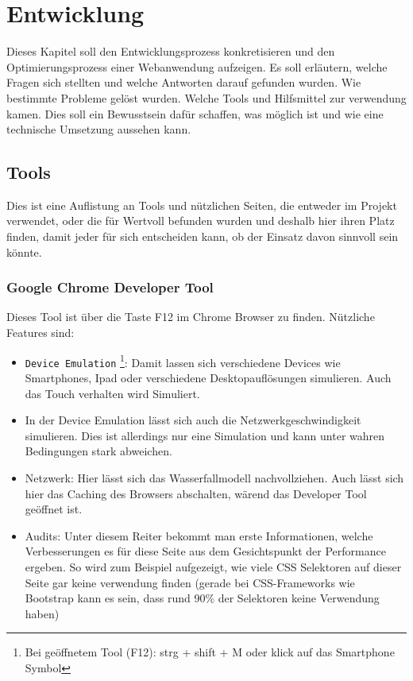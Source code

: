 \section{Entwicklung} %
\label{sec:entwicklung}
	Dieses Kapitel soll den Entwicklungsprozess konkretisieren und den Optimierungsprozess einer Webanwendung aufzeigen. Es soll erläutern, welche Fragen sich stellten und welche Antworten darauf gefunden wurden. Wie bestimmte Probleme gelöst wurden. Welche Tools und Hilfsmittel zur verwendung kamen. Dies soll ein Bewusstsein dafür schaffen, was möglich ist und wie eine technische Umsetzung aussehen kann. 
	
	\subsection{Tools}
	\label{sub:tools}
		Dies ist eine Auflistung an Tools und nützlichen Seiten, die entweder im Projekt verwendet, oder die für Wertvoll befunden wurden und deshalb hier ihren Platz finden, damit jeder für sich entscheiden kann, ob der Einsatz davon sinnvoll sein könnte.

		\subsubsection{Google Chrome Developer Tool} %
		\label{ssub:google_chrome_developertool}
			Dieses Tool ist über die Taste F12 im Chrome Browser zu finden. Nützliche Features sind: 

			\begin{itemize}
				\item \texttt{Device Emulation} \footnote{Bei geöffnetem Tool (F12): strg + shift + M oder klick auf das Smartphone Symbol}: Damit lassen sich verschiedene Devices wie Smartphones, Ipad oder verschiedene Desktopauflösungen simulieren. Auch das Touch verhalten wird Simuliert.
				\item In der Device Emulation lässt sich auch die Netzwerkgeschwindigkeit simulieren. Dies ist allerdings nur eine Simulation und kann unter wahren Bedingungen stark abweichen.
				\item Netzwerk: Hier lässt sich das Wasserfallmodell nachvollziehen. Auch lässt sich hier das Caching des Browsers abschalten, wärend das Developer Tool geöffnet ist.
				\item Audits: Unter diesem Reiter bekommt man erste Informationen, welche Verbesserungen es für diese Seite aus dem Gesichtspunkt der Performance ergeben. So wird zum Beispiel aufgezeigt, wie viele CSS Selektoren auf dieser Seite gar keine verwendung finden (gerade bei CSS-Frameworks wie Bootstrap kann es sein, dass rund 90\% der Selektoren keine Verwendung haben)
			\end{itemize}

